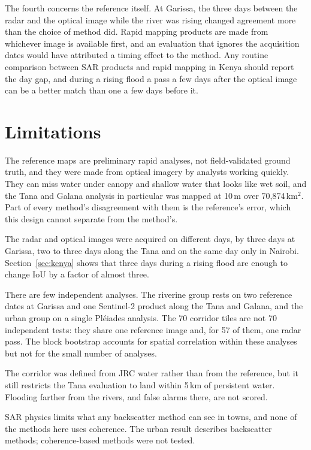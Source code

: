 \documentclass[11pt]{article}
\begin{document}
The fourth concerns the reference itself. At Garissa, the three days between
the radar and the optical image while the river was rising changed agreement
more than the choice of method did. Rapid mapping
products are made from whichever image is available first, and an evaluation
that ignores the acquisition dates would have attributed a timing effect to
the method. Any routine comparison between SAR products and rapid mapping in
Kenya should report the day gap, and during a rising flood a pass a few days
after the optical image can be a better match than one a few days before it.

\section{Limitations}
\label{sec:limitations}

The reference maps are preliminary rapid analyses, not field-validated
ground truth, and they were made from optical imagery by analysts working
quickly. They can miss water under canopy and shallow water that looks like
wet soil, and the Tana and Galana analysis in particular was mapped at
10\,m over 70,874\,km$^2$. Part of every method's disagreement with them is
the reference's error, which this design cannot separate from the method's.

The radar and optical images were acquired on different days, by three days
at Garissa, two to three days along the Tana and on the same day only in
Nairobi. Section~\ref{sec:kenya} shows that three days during a rising flood
are enough to change IoU by a factor of almost three.

There are few independent analyses. The riverine group rests on two reference
dates at Garissa and one Sentinel-2 product along the Tana and Galana, and
the urban group on a single Pléiades analysis. The 70 corridor tiles are not
70 independent tests: they share one reference image and, for 57 of them, one
radar pass. The block bootstrap accounts for spatial correlation within these
analyses but not for the small number of analyses.

The corridor was defined from JRC water rather than from the reference, but
it still restricts the Tana evaluation to land within 5\,km of persistent
water. Flooding farther from the rivers, and false alarms there, are not
scored.

SAR physics limits what any backscatter method can see in towns, and none of
the methods here uses coherence. The urban result describes backscatter
methods; coherence-based methods were not tested.
\end{document}
